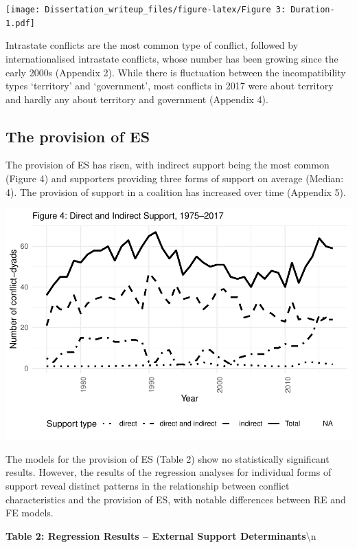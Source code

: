 \documentclass[
]{article}
\begin{document}
\texttt{[image: Dissertation\_writeup\_files/figure-latex/Figure 3: Duration-1.pdf]}

Intrastate conflicts are the most common type of conflict, followed by
internationalised intrastate conflicts, whose number has been growing
since the early 2000s (Appendix 2). While there is fluctuation between
the incompatibility types `territory' and `government', most conflicts
in 2017 were about territory and hardly any about territory and
government (Appendix 4).

\subsection{The provision of ES}\label{the-provision-of-es}

The provision of ES has risen, with indirect support being the most
common (Figure 4) and supporters providing three forms of support on
average (Median: 4). The provision of support in a coalition has
increased over time (Appendix 5).

\includegraphics{Dissertation_writeup_files/figure-latex/Figure 4 (In-)direct support-1.pdf}

The models for the provision of ES (Table 2) show no statistically
significant results. However, the results of the regression analyses for
individual forms of support reveal distinct patterns in the relationship
between conflict characteristics and the provision of ES, with notable
differences between RE and FE models.

\newpage

\noindent\textbf{Table 2: Regression Results – External Support Determinants}\textbackslash n
\end{document}
